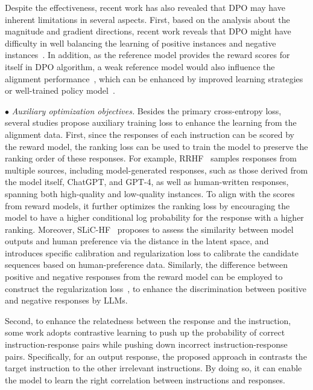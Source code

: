 {Despite the effectiveness, recent work has also revealed that DPO may have inherent limitations in several aspects. First, based on the analysis about the magnitude and gradient directions, recent work reveals that DPO might have difficulty in well balancing the learning of positive instances and negative instances~\cite{Feng-arxiv-2024-Towards}. In addition, as the reference model provides the reward scores for itself in DPO algorithm, a weak reference model would also influence the alignment performance~\cite{Gorbatovski-arxiv-2024-Learn}, which can be enhanced by improved learning strategies~\cite{Kim-arxiv-2024-sDPO} or well-trained policy model~\cite{Gorbatovski-arxiv-2024-Learn}. 

$\bullet$ \textit{Auxiliary optimization objectives.} Besides the primary cross-entropy loss, several studies propose auxiliary training loss to enhance the learning from the alignment data. First, since the responses of each instruction can be scored by the reward model, the ranking loss can be used to train the model to preserve the ranking order of these responses. For example, RRHF~\cite{Yuan-RRHF-2023-arxiv} samples responses from multiple sources, including model-generated responses, such as those derived from the model itself, ChatGPT, and GPT-4, as well as human-written responses, spanning both high-quality and low-quality instances. To align with the scores from reward models, it further optimizes the ranking loss by encouraging the model to have a higher conditional log probability for the response with a higher ranking. Moreover, SLiC-HF~\cite{Zhao-arxiv-2023-slichf} proposes to assess the similarity between model outputs and human preference via the distance in the latent space,  and introduces specific calibration and regularization loss to calibrate the candidate sequences based on human-preference data. Similarly, the difference between positive and negative responses from the reward model can be employed to construct the regularization loss~\cite{Fisch-arxiv-2024-Robust}, to enhance the discrimination between positive and negative responses by LLMs. 

Second, to enhance the relatedness between the response and the instruction, some work adopts contrastive learning to push up the probability of correct instruction-response pairs while pushing down incorrect instruction-response pairs. Specifically, for an output response, the proposed approach in \cite{Zhang-arxiv-2023-The} contrasts the target instruction to the other irrelevant instructions. By doing so, it can enable the model to learn the right correlation between instructions and responses.

}
